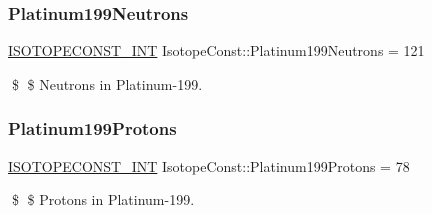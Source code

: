\subsubsection{\texorpdfstring{Platinum199\+Neutrons}{Platinum199Neutrons}}
{\footnotesize\ttfamily \mbox{\hyperlink{group___isotope_const-_macros_ga5f18360b3e99483a35c32d789e62621c}{I\+S\+O\+T\+O\+P\+E\+C\+O\+N\+S\+T\+\_\+\+I\+NT}} Isotope\+Const\+::\+Platinum199\+Neutrons = 121}

\$ \$ Neutrons in Platinum-\/199. \mbox{\label{group___isotope_const-_platinum-_pt199_gabb711b8d89472554626613e33688288d}} 
\subsubsection{\texorpdfstring{Platinum199\+Protons}{Platinum199Protons}}
{\footnotesize\ttfamily \mbox{\hyperlink{group___isotope_const-_macros_ga5f18360b3e99483a35c32d789e62621c}{I\+S\+O\+T\+O\+P\+E\+C\+O\+N\+S\+T\+\_\+\+I\+NT}} Isotope\+Const\+::\+Platinum199\+Protons = 78}

\$ \$ Protons in Platinum-\/199. 